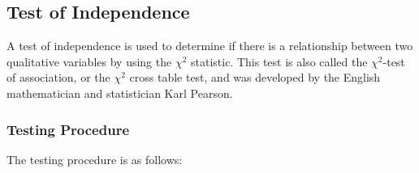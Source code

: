\subsection{Test of Independence}
\label{ssec:test-of-independence}

A test of independence is used to determine if there is a relationship between two qualitative variables by using the $\chi^2$ statistic. This test is also called the $\chi^2$-test of association, or the $\chi^2$ cross table test, and was developed by the English mathematician and statistician Karl Pearson.

\subsubsection{Testing Procedure}

The testing procedure is as follows:

